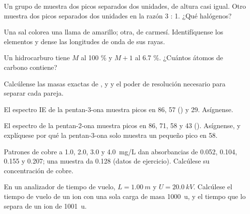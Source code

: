 \begin{exercise}[$\star$]\label{exo:b2:mass-spec-atomic:3}
Un grupo de  muestra dos picos separados dos unidades, de altura casi igual. Otro muestra dos
picos separados dos unidades en la razón 3 : 1. ¿Qué halógenos?
\end{exercise}

\begin{exercise}[$\star$]\label{exo:b2:mass-spec-atomic:4}
Una sal colorea una llama de amarillo; otra, de carmesí. Identifíquense los elementos y dense las longitudes de onda de sus
rayas.
\end{exercise}

\begin{exercise}[$\star\star$]\label{exo:b2:mass-spec-atomic:5}
Un hidrocarburo tiene $M$ al 100 \% y $M+1$ al 6.7 \%. ¿Cuántos átomos de carbono contiene?
\end{exercise}

\begin{exercise}[$\star\star$]\label{exo:b2:mass-spec-atomic:6}
Calcúlense las masas exactas de ,  y  y el poder de resolución necesario para separar
cada pareja.
\end{exercise}

\begin{exercise}[$\star\star$]\label{exo:b2:mass-spec-atomic:7}
El espectro IE de la pentan-3-ona muestra picos en 86, 57 () y 29. Asígnense.
\end{exercise}

\begin{exercise}[$\star\star$]\label{exo:b2:mass-spec-atomic:8}
El espectro de la pentan-2-ona muestra picos en 86, 71, 58 y 43 (). Asígnense, y explíquese
por qué la pentan-3-ona solo muestra un pequeño pico en 58.
\end{exercise}

\begin{exercise}[$\star\star$]\label{exo:b2:mass-spec-atomic:9}
Patrones de cobre a 1.0, 2.0, 3.0 y \qty{4.0}{mg/L} dan absorbancias de 0.052, 0.104, 0.155 y 0.207;
una muestra da 0.128 (datos de ejercicio). Calcúlese su concentración de cobre.
\end{exercise}

\begin{exercise}[$\star\star\star$]\label{exo:b2:mass-spec-atomic:10}
En un analizador de tiempo de vuelo, $L = \qty{1.00}{m}$ y $U = \qty{20.0}{kV}$. Calcúlese el tiempo de vuelo de
un ion con una sola carga de masa \qty{1000}{u}, y el tiempo que lo separa de un ion de \qty{1001}{u}.
\end{exercise}

